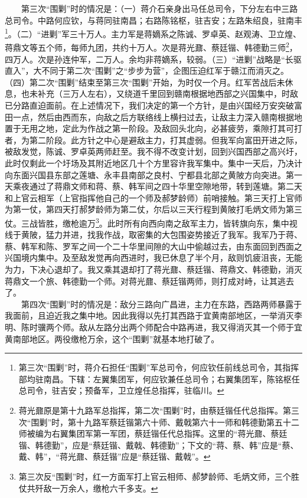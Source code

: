\documentclass[cn,11pt,chinese]{elegantbook}
\begin{document}
　　第三次“围剿”时的情况是：（一）蒋介石亲身出马任总司令，下分左右中三路总司令。中路何应钦，与蒋同驻南昌；右路陈铭枢，驻吉安；左路朱绍良，驻南丰\footnote[48]{ 第三次“围剿”时，蒋介石担任“围剿”军总司令，何应钦任前线总司令，其指挥部均驻南昌。下辖：左翼集团军，何应钦兼任总司令；右翼集团军，陈铭枢任总司令，驻吉安；预备军，卫立煌任总指挥，驻临川。}。（二）“进剿”军三十万人。主力军是蒋嫡系之陈诚、罗卓英、赵观涛、卫立煌、蒋鼎文等五个师，每师九团，共约十万人。次是蒋光鼐、蔡廷锴、韩德勤三师\footnote[49]{ 蒋光鼐原是第十九路军总指挥，第二次“围剿”时，由蔡廷锴任代总指挥。第三次“围剿”时，第十九路军蔡廷锴第六十师、戴戟第六十一师和韩德勤第五十二师被编为右翼集团军第一军团，蔡廷锴任代总指挥。这里的“蒋光鼐、蔡廷锴、韩德勤”，应是“蔡廷锴、戴戟、韩德勤”；下文的“蒋、蔡、韩”应是“蔡、戴、韩”，“蒋光鼐、蔡廷锴”应是“蔡廷锴、戴戟”。}，四万人。次是孙连仲军，二万人。余均非蒋嫡系，较弱。（三）“进剿”战略是“长驱直入”，大不同于第二次“围剿”之“步步为营”，企图压迫红军于赣江而消灭之。（四）第二次“围剿”结束至第三次“围剿”开始，为时仅一个月。红军苦战后未休息，也未补充（三万人左右），又绕道千里回到赣南根据地西部之兴国集中，时敌已分路直迫面前。在上述情况下，我们决定的第一个方针，是由兴国经万安突破富田一点，然后由西而东，向敌之后方联络线上横扫过去，让敌主力深入赣南根据地置于无用之地，定此为作战之第一阶段。及敌回头北向，必甚疲劳，乘隙打其可打者，为第二阶段。此方针之中心是避敌主力，打其虚弱。但我军向富田开进之际，被敌发觉，陈诚、罗卓英两师赶至。我不得不改变计划，回到兴国西部之高兴圩，此时仅剩此一个圩场及其附近地区几十个方里容许我军集中。集中一天后，乃决计向东面兴国县东部之莲塘、永丰县南部之良村、宁都县北部之黄陂方向突进。第一天乘夜通过了蒋鼎文师和蒋、蔡、韩军间之四十华里空隙地带，转到莲塘。第二天和上官云相军（上官指挥他自己的一个师及郝梦龄师）前哨接触。第三天打上官师为第一仗，第四天打郝梦龄师为第二仗，尔后以三天行程到黄陂打毛炳文师为第三仗。三战皆胜，缴枪逾万\footnote[50]{ 第三次反“围剿”时，红一方面军打上官云相师、郝梦龄师、毛炳文师，三个胜仗共歼敌一万余人，缴枪六千多支。}。此时所有向西向南之敌军主力，皆转旗向东，集中视线于黄陂，猛力并进，找我作战，取密集的大包围姿势接近了我军。我军乃于蒋、蔡、韩军和陈、罗军之间一个二十华里间隙的大山中偷越过去，由东面回到西面之兴国境内集中。及至敌发觉再向西进时，我已休息了半个月，敌则饥疲沮丧，无能为力，下决心退却了。我又乘其退却打了蒋光鼐、蔡廷锴、蒋鼎文、韩德勤，消灭蒋鼎文一个旅、韩德勤一个师。对蒋光鼐、蔡廷锴两师，则打成对峙，让其逃去了。\\
　　第四次“围剿”时的情况是：敌分三路向广昌进，主力在东路，西路两师暴露于我面前，且迫近我之集中地。因此我得以先打其西路于宜黄南部地区，一举消灭李明、陈时骥两个师。敌从左路分出两个师配合中路再进，我又得消灭其一个师于宜黄南部地区。两役缴枪万余，这个“围剿”就基本地打破了。\\
\end{document}
